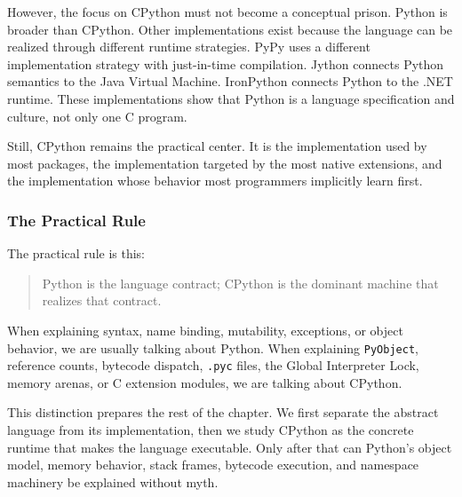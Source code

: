 However, the focus on CPython must not become a conceptual prison. Python is broader than CPython. Other implementations exist because the language can be realized through different runtime strategies. PyPy uses a different implementation strategy with just-in-time compilation. Jython connects Python semantics to the Java Virtual Machine. IronPython connects Python to the .NET runtime. These implementations show that Python is a language specification and culture, not only one C program.

Still, CPython remains the practical center. It is the implementation used by most packages, the implementation targeted by the most native extensions, and the implementation whose behavior most programmers implicitly learn first.

\subsubsection{The Practical Rule}

The practical rule is this:

\begin{quote}
Python is the language contract; CPython is the dominant machine that realizes that contract.
\end{quote}

When explaining syntax, name binding, mutability, exceptions, or object behavior, we are usually talking about Python. When explaining \texttt{PyObject}, reference counts, bytecode dispatch, \texttt{.pyc} files, the Global Interpreter Lock, memory arenas, or C extension modules, we are talking about CPython.

This distinction prepares the rest of the chapter. We first separate the abstract language from its implementation, then we study CPython as the concrete runtime that makes the language executable. Only after that can Python's object model, memory behavior, stack frames, bytecode execution, and namespace machinery be explained without myth.